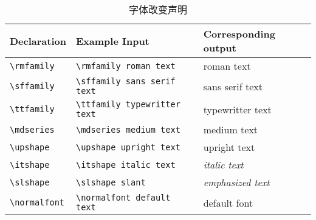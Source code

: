 \begin{table}[H]
  \centering
  \caption{字体改变声明}
  \label{tbl:fontdeclaration}
  \begin{tabular}{lll}
    \toprule
    \textbf{Declaration} & \textbf{Example Input} & \textbf{Corresponding output} \\ 
    \midrule
    \verb+\rmfamily+ & \verb+\rmfamily roman text+ & {\rmfamily roman text }\\
    \verb+\sffamily+ & \verb+\sffamily sans serif text+ & {\sffamily sans serif text }\\ 
    \verb+\ttfamily+ & \verb+\ttfamily typewritter text+ & {\ttfamily typewritter text}\\
    \verb+\mdseries+ & \verb+\mdseries medium text+ & {\mdseries medium text}\\ 
    \verb+\upshape+  & \verb+\upshape upright text+ & {\upshape upright text}\\ 
    \verb+\itshape+ & \verb+\itshape italic text+ & {\itshape italic text}\\ 
    \verb+\slshape+ & \verb+\slshape slant+ & {\em emphasized text} \\
    \verb+\normalfont+ & \verb+\normalfont default text+ & {\normalfont
                                                           default font}\\
    \bottomrule
  \end{tabular}
\end{table}


